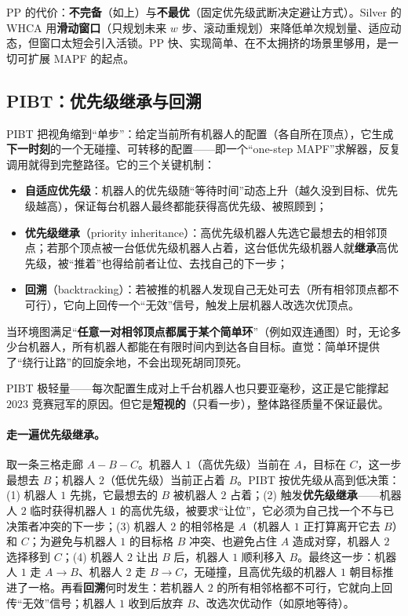 PP 的代价：\textbf{不完备}（如上）与\textbf{不最优}（固定优先级武断决定避让方式）。Silver 的 WHCA\* 用\textbf{滑动窗口}（只规划未来 $w$ 步、滚动重规划）来降低单次规划量、适应动态，但窗口太短会引入活锁\cite{silver2005cooperative}。PP 快、实现简单、在不太拥挤的场景里够用，是一切可扩展 MAPF 的起点。

\subsection{PIBT：优先级继承与回溯}
\label{sec:mapf-pibt}

PIBT 把视角缩到“单步”：给定当前所有机器人的配置（各自所在顶点），它生成\textbf{下一时刻}的一个无碰撞、可转移的配置——即一个“one-step MAPF”求解器，反复调用就得到完整路径\cite{okumura2022pibt}。它的三个关键机制：

\begin{itemize}
  \item \textbf{自适应优先级}：机器人的优先级随“等待时间”动态上升（越久没到目标、优先级越高），保证每台机器人最终都能获得高优先级、被照顾到；
  \item \textbf{优先级继承}（priority inheritance）：高优先级机器人先选它最想去的相邻顶点；若那个顶点被一台低优先级机器人占着，这台低优先级机器人就\textbf{继承}高优先级，被“推着”也得给前者让位、去找自己的下一步；
  \item \textbf{回溯}（backtracking）：若被推的机器人发现自己无处可去（所有相邻顶点都不可行），它向上回传一个“无效”信号，触发上层机器人改选次优顶点。
\end{itemize}

\begin{theorem}\label{thm:mapf-pibt}
当环境图满足“\textbf{任意一对相邻顶点都属于某个简单环}”（例如双连通图）时，无论多少台机器人，所有机器人都能在有限时间内到达各自目标\cite{okumura2022pibt}。直觉：简单环提供了“绕行让路”的回旋余地，不会出现死胡同顶死。
\end{theorem}

PIBT 极轻量——每次配置生成对上千台机器人也只要亚毫秒，这正是它能撑起 $2023$ 竞赛冠军的原因。但它是\textbf{短视的}（只看一步），整体路径质量不保证最优。

\paragraph{走一遍优先级继承。}
取一条三格走廊 $A\!-\!B\!-\!C$。机器人 $1$（高优先级）当前在 $A$，目标在 $C$，这一步最想去 $B$；机器人 $2$（低优先级）当前正占着 $B$。PIBT 按优先级从高到低决策：(1) 机器人 $1$ 先挑，它最想去的 $B$ 被机器人 $2$ 占着；(2) 触发\textbf{优先级继承}——机器人 $2$ 临时获得机器人 $1$ 的高优先级，被要求“让位”，它必须为自己找一个不与已决策者冲突的下一步；(3) 机器人 $2$ 的相邻格是 $A$（机器人 $1$ 正打算离开它去 $B$）和 $C$；为避免与机器人 $1$ 的目标格 $B$ 冲突、也避免占住 $A$ 造成对穿，机器人 $2$ 选择移到 $C$；(4) 机器人 $2$ 让出 $B$ 后，机器人 $1$ 顺利移入 $B$。最终这一步：机器人 $1$ 走 $A\to B$、机器人 $2$ 走 $B\to C$，无碰撞，且高优先级的机器人 $1$ 朝目标推进了一格。再看\textbf{回溯}何时发生：若机器人 $2$ 的所有相邻格都不可行，它就向上回传“无效”信号；机器人 $1$ 收到后放弃 $B$、改选次优动作（如原地等待）。

